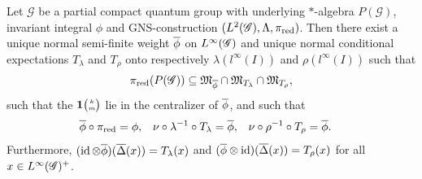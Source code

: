 \begin{Prop} \label{prop:vn-phi} Let $\mathscr{G}$ be a partial
  compact quantum group with underlying $*$-algebra $P(\mathscr{G})$,
  invariant integral $\phi$ and GNS-construction
  $(L^{2}(\mathscr{G}),\Lambda,\pi_{\operatorname{\mathrm{red}}})$. Then there exist a unique normal semi-finite weight $\overline{\phi}$ on $L^{\infty}(\mathscr{G})$ and unique normal
  conditional expectations $T_{\lambda}$ and $T_{\rho}$ onto respectively $\lambda(l^{\infty}(I))$ and $\rho(l^{\infty}(I))$ such that
  \[\pi_{\operatorname{\mathrm{red}}}(P(\mathscr{G})) \subseteq
  \mathfrak{M}_{\overline{\phi}} \cap   \mathfrak{M}_{T_{\lambda}} \cap
  \mathfrak{M}_{T_{\rho}},\] such that the $\mathbf{1}{\tiny {\begin{pmatrix} k\\m\end{pmatrix}}}$ lie in the centralizer of $\overline{\phi}$, and  such that
  \begin{align*}
\overline{\phi} \circ \pi_{\operatorname{\mathrm{red}}} &= \phi,&
\nu \circ \lambda^{-1}\circ T_{\lambda}   &= \overline{\phi}, &  \nu \circ \rho^{-1} \circ
  T_{\rho} &= \overline{\phi}.
  \end{align*}
Furthermore,  $(\operatorname{id} \otimes \overline{\phi})(\overline{\Delta}(x)) =  T_{\lambda}(x)$ and $
    (\overline{\phi} \otimes \operatorname{id})(\overline{\Delta}(x)) = T_{\rho}(x)$ 
 for all
  $x\in L^{\infty}(\mathscr{G})^{+}$.
\end{Prop}
